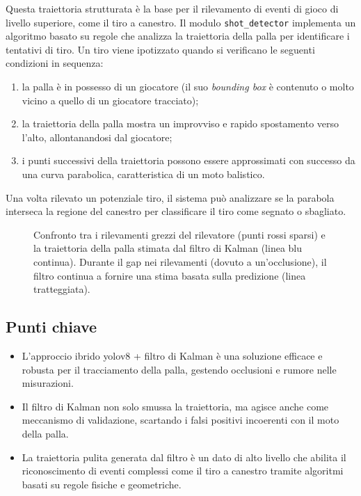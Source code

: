 \documentclass[12pt,a4paper,openright,twoside]{book}
\begin{document}
Questa traiettoria strutturata è la base per il rilevamento di eventi di gioco di livello superiore, come il tiro a canestro. 
Il modulo \texttt{shot\_detector} implementa un algoritmo basato su regole che analizza la traiettoria della palla per identificare 
i tentativi di tiro. Un tiro viene ipotizzato quando si verificano le seguenti condizioni in sequenza:
\begin{enumerate}
  \item la palla è in possesso di un giocatore (il suo \emph{bounding box} è contenuto o molto vicino a quello di un giocatore tracciato);
  \item la traiettoria della palla mostra un improvviso e rapido spostamento verso l'alto, allontanandosi dal giocatore;
  \item i punti successivi della traiettoria possono essere approssimati con successo da una curva parabolica, caratteristica 
  di un moto balistico.
\end{enumerate}

Una volta rilevato un potenziale tiro, il sistema può analizzare se la parabola interseca la regione del canestro per classificare 
il tiro come segnato o sbagliato.

\begin{figure}[h]
\centering
\caption{Confronto tra i rilevamenti grezzi del rilevatore (punti rossi sparsi) e la traiettoria della palla stimata dal filtro di Kalman
(linea blu continua). Durante il gap nei rilevamenti (dovuto a un'occlusione), il filtro continua a fornire una stima basata sulla 
predizione (linea tratteggiata).}
\label{fig:kalman_filter_ball}
\end{figure}

\subsection*{Punti chiave}
\begin{itemize}
  \item L'approccio ibrido \ac{yolo}v8 + filtro di Kalman è una soluzione efficace e robusta per il tracciamento della palla, 
  gestendo occlusioni e rumore nelle misurazioni.
  \item Il filtro di Kalman non solo smussa la traiettoria, ma agisce anche come meccanismo di validazione, scartando i falsi 
  positivi incoerenti con il moto della palla.
  \item La traiettoria pulita generata dal filtro è un dato di alto livello che abilita il riconoscimento di eventi complessi 
  come il tiro a canestro tramite algoritmi basati su regole fisiche e geometriche.
\end{itemize}
\end{document}
